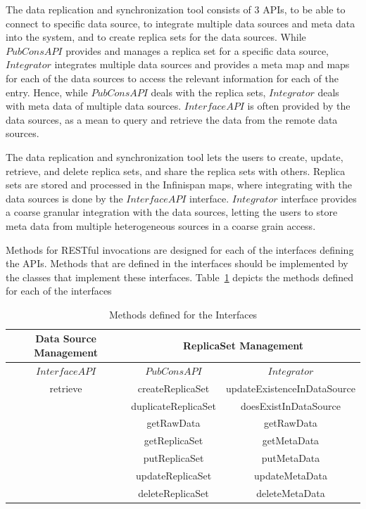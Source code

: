 \documentclass[conference]{IEEEtran}
\begin{document}
The data replication and synchronization tool consists of 3 APIs, to be able to connect to specific data source, to integrate multiple data sources and meta data into the system, and to create replica sets for the data sources. While $PubConsAPI$ provides and manages a replica set for a specific data source, $Integrator$ integrates multiple data sources and provides a meta map and maps for each of the data sources to access the relevant information for each of the entry. Hence, while $PubConsAPI$ deals with the replica sets, $Integrator$ deals with meta data of multiple data sources. $InterfaceAPI$ is often provided by the data sources, as a mean to query and retrieve the data from the remote data sources.


The data replication and synchronization tool lets the users to create, update, retrieve, and delete replica sets, and share the replica sets with others. Replica sets are stored and processed in the Infinispan maps, where integrating with the data sources is done by the $InterfaceAPI$ interface. $Integrator$ interface provides a coarse granular integration with the data sources, letting the users to store meta data from multiple heterogeneous sources in a coarse grain access. 

Methods for RESTful invocations are designed for each of the interfaces defining the APIs. Methods that are defined in the interfaces should be implemented by the classes that implement these interfaces. Table~\ref{table:interfaces} depicts the methods defined for each of the interfaces

\begin{table}[!ht]
\centering
\caption{Methods defined for the Interfaces}
\label{table:interfaces}
\begin{tabular}{|c||c| |c|}

\toprule
\textbf{Data Source Management} & \multicolumn{2}{c}{\textbf{ReplicaSet Management}} \\
\midrule

\textbf{$InterfaceAPI$} & \textbf{$PubConsAPI$}&\textbf{$Integrator$} \\
\hline
retrieve & createReplicaSet&updateExistenceInDataSource \\
  & duplicateReplicaSet&doesExistInDataSource\\
  & getRawData&getRawData\\
 & getReplicaSet&getMetaData \\
 & putReplicaSet&putMetaData \\
 & updateReplicaSet&updateMetaData \\
 & deleteReplicaSet&deleteMetaData \\
\bottomrule
\end{tabular}
\end{table}
\end{document}
